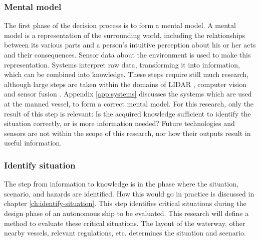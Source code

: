 \subsubsection{Mental model}
The first phase of the decision process is to form a mental model. A mental model is a representation of the surrounding world, including the relationships between its various parts and a person's intuitive perception about his or her acts and their consequences.
Sensor data about the environment is used to make this representation. Systems interpret raw data, transforming it into information, which can be combined into knowledge. 
These steps require still much research, although large steps are taken within the domains of LIDAR \cite{Cameron2017}, computer vision \cite{Marr2017} and sensor fusion \cite{Hoffman2018}. Appendix \ref{app:systems} discusses the systems which are used at the manned vessel, to form a correct mental model. For this research, only the result of this step is relevant: Is the acquired knowledge sufficient to identify the situation correctly, or is more information needed?
Future technologies and sensors are not within the scope of this research, nor how their outputs result in useful information. 

\subsubsection{Identify situation}
The step from information to knowledge is in the phase where the situation, scenario, and hazards are identified. How this would go in practice is discussed in chapter \ref{ch:identify-situation}. This step identifies critical situations during the design phase of an autonomous ship to be evaluated. 
This research will define a method to evaluate these critical situations. The layout of the waterway, other nearby vessels, relevant regulations, etc. determines the situation and scenario.

